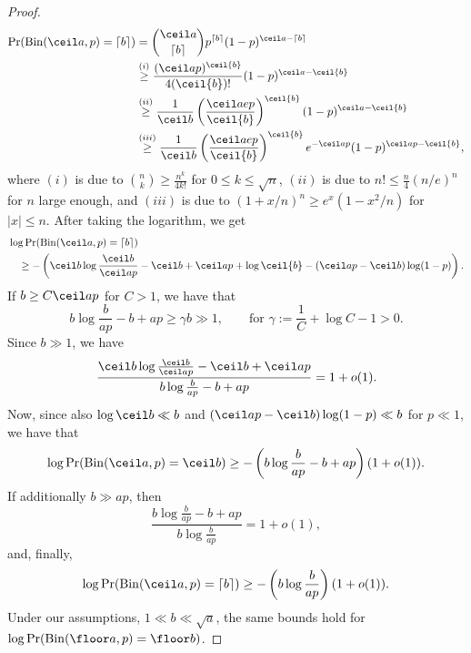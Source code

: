 \begin{proof}
    \begin{align*}
\Pr(\mathrm{Bin}(\ceil a, p) = \lceil b \rceil) &= {\ceil a \choose \lceil b \rceil} p^{\lceil b \rceil}(1 - p)^{\ceil a - \lceil b \rceil} \\
&\overset{(i)}{\geq} \frac{(\ceil a p)^{  \ceil{b}  }}{4 (  \ceil{b}  )!} (1 - p)^{\ceil a -   \ceil{b}  } \\
&\overset{(ii)}{\geq} \frac{1}{\ceil b} \left(\frac{\ceil a e p}{  \ceil{b}  } \right)^{  \ceil{b}  } (1 - p)^{\ceil a -   \ceil{b}  } \\
&\overset{(iii)}{\geq} \frac{1}{\ceil b} \left(\frac{\ceil a e p}{  \ceil{b}  } \right)^{  \ceil{b}  } e^{-\ceil a p} (1 - p)^{\ceil a p - \ceil{b} },
\end{align*}
where $(i)$ is due to ${n \choose k} \geq \frac{n^k}{4k!}$ for $0 \leq k \leq \sqrt{n}$, $(ii)$ is due to $n! \leq \frac{n}{4}(n/e)^n$ for $n$ large enough, and $(iii)$ is due to $(1 + x/n)^n \geq e^x (1 - x^2/n)$ for $|x|\leq n$.
After taking the logarithm, we get 
\begin{align*}
    &\log \Pr(\mathrm{Bin}(\ceil a, p) = \lceil b \rceil) \\
    &\quad \geq - \left(\ceil b \log \frac{\ceil b}{\ceil a  p} - \ceil b + \ceil a p +  \log \ceil{b} - (\ceil a p - \ceil b) \log (1 - p) \right).
\end{align*}
If \(b \geq C \ceil a p\) for \(C > 1\), we have that 
\begin{equation*}
    b \log \frac{b}{ap} - b + ap \geq \gamma b \gg 1, \qquad \text{for } \gamma := \frac{1}{C} + \log C - 1 > 0.
\end{equation*}
Since \(b \gg 1\), we have
\begin{equation*}
\frac{\ceil b \log \frac{\ceil b}{\ceil a p} - \ceil b + \ceil a p}{ b \log \frac{b}{ap} - b + ap} = 1 + o(1).
\end{equation*}
Now, since also \(\log \ceil b \ll b\) and \((\ceil a p - \ceil b) \log (1 - p) \ll b\) for \(p \ll 1\), we have that
\begin{equation*}
    \log \Pr(\mathrm{Bin}(\ceil a, p) = \ceil b) \geq - \left(b \log \frac{b}{ap} - b + ap\right)(1 + o(1)).
\end{equation*}
If additionally \(b \gg ap\), then 
\begin{equation*}
    \frac{b \log \frac{b}{ap} - b + ap}{b \log \frac{b}{ap}} = 1 + o(1),
\end{equation*}
and, finally,
\begin{equation*}
    \log \Pr(\mathrm{Bin}(\ceil a, p) = \lceil b \rceil) \geq - \left(b \log \frac{b}{ap}\right)(1 + o(1)).
\end{equation*}
Under our assumptions, \(1 \ll b \ll \sqrt{a}\), the same bounds hold for \(\log \Pr(\mathrm{Bin}(\floor a, p) = \floor b)\).
\end{proof}

